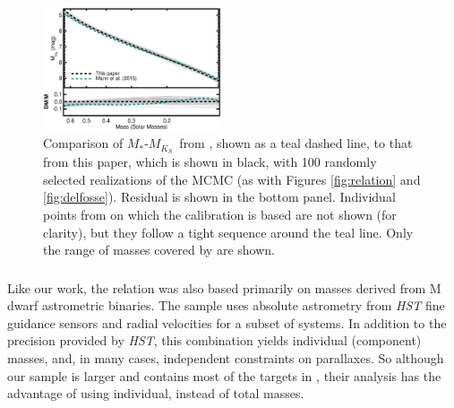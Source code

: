 \documentclass[twocolumn]{aastex62}
\newcommand{\mks}{$M_{K_S}$}
\begin{document}
\begin{figure}[htb]
\begin{center}
\includegraphics[width=0.47\textwidth]{Mann_comp.eps}
\caption{Comparison of $M_*$-\mks\ from \citet{Mann2015b}, shown as a teal dashed line, to that from this paper, which is shown in black, with 100 randomly selected realizations of the MCMC (as with Figures \ref{fig:relation} and \ref{fig:delfosse}). Residual is shown in the bottom panel. Individual points from \citet{Mann2015b} on which the calibration is based are not shown (for clarity), but they follow a tight sequence around the teal line. Only the range of masses covered by \citet{Mann2015b} are shown. }
\label{fig:mann}
\end{center}
\end{figure}


\subsubsection{\citet{Benedict2016}}
Like our work, the \citet{Benedict2016} relation was also based primarily on masses derived from M dwarf astrometric binaries. The \citet{Benedict2016} sample uses absolute astrometry from {\it HST} fine guidance sensors and radial velocities for a subset of systems. In addition to the precision provided by {\it HST}, this combination yields individual (component) masses, and, in many cases, independent constraints on parallaxes. So although our sample is larger and contains most of the targets in \citet{Benedict2016}, their analysis has the advantage of using individual, instead of total masses.
\end{document}
